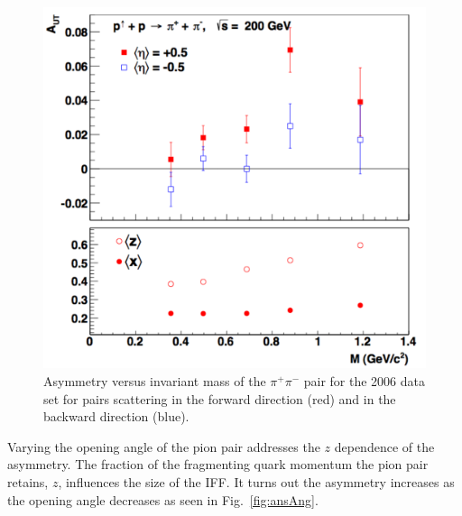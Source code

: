 \documentclass[letterpaper, abstract = on,listof=totoc, bibliography=totoc]{scrreprt}
\newcommand{\pip}{\pi^+}
\newcommand{\pim}{\pi^-}
\newcommand{\pair}{$\pip\pim$ }
\begin{document}
 \begin{figure}
\begin{center}
\includegraphics[width = 1\textwidth]{ansM_new}
\caption[$A_{UT}$ $vs$ Invariant Mass in the 2006 data set]{Asymmetry versus invariant mass of the \pair pair for the 2006 data set for pairs scattering in the forward direction (red) and in the backward direction (blue).}
\label{fig:ansM}
\end{center}
\end{figure}


Varying the opening angle of the pion pair addresses the $z$ dependence of the asymmetry. The fraction of the fragmenting quark momentum the pion pair retains, $z$, influences the size of the IFF. It turns out the asymmetry increases as the opening angle decreases as seen in Fig.~\ref{fig:ansAng}.
\end{document}
